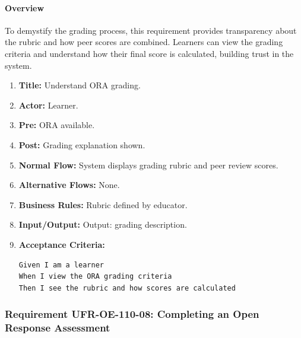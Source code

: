 \paragraph{Overview}
To demystify the grading process, this requirement provides transparency about the rubric and how peer scores are combined. Learners can view the grading criteria and understand how their final score is calculated, building trust in the system.
\begin{enumerate}[label=\textbf{\arabic*.}]
\item \textbf{Title:} Understand ORA grading.
\item \textbf{Actor:} Learner.
\item \textbf{Pre:} ORA available.
\item \textbf{Post:} Grading explanation shown.
\item \textbf{Normal Flow:} System displays grading rubric and peer review scores.
\item \textbf{Alternative Flows:} None.
\item \textbf{Business Rules:} Rubric defined by educator.
\item \textbf{Input/Output:} Output: grading description.
\item \textbf{Acceptance Criteria:}
    \begin{verbatim}
Given I am a learner
When I view the ORA grading criteria
Then I see the rubric and how scores are calculated
    \end{verbatim}
\end{enumerate}

\subsubsection{Requirement UFR-OE-110-08: Completing an Open Response Assessment}
